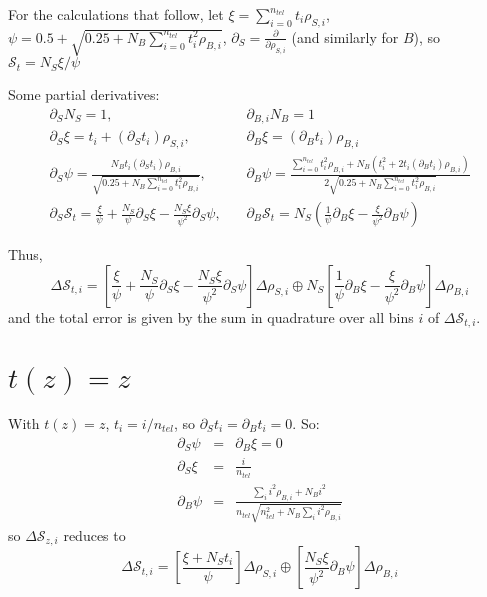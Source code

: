 For the calculations that follow, let $\xi=\sum_{i=0}^{n_{tel}}t_i\rho_{S,i}$, $\psi=0.5+\sqrt{0.25+N_B\sum_{i=0}^{n_{tel}}t^2_i\rho_{B,i}}$, $\partial_{S}=\frac{\partial}{\partial \rho_{S,i}}$ (and similarly for $B$), so $\mathscr{S}_t=N_S\xi/\psi$

Some partial derivatives:
\begin{eqnarray*}
\partial_SN_S=1,&\,&\partial_{B,i}N_B=1\\
\partial_S\xi=t_i+\left(\partial_S t_i\right)\rho_{S,i},&\,&\partial_B\xi=\left(\partial_B t_i\right)\rho_{B,i}\\
\partial_S\psi=\frac{N_Bt_i\left(\partial_S t_i\right)\rho_{B,i}}{\sqrt{0.25+N_B\sum_{i=0}^{n_{tel}}t^2_i\rho_{B,i}}},&\,&\partial_B\psi=\frac{\sum_{i=0}^{n_{tel}}t^2_i\rho_{B,i}+N_B\left(t_i^2+2t_i\left(\partial_B t_i\right)\rho_{B,i}\right)}{2\sqrt{0.25+N_B\sum_{i=0}^{n_{tel}}t^2_i\rho_{B,i}}}\\
\partial_S\mathscr{S}_t=\frac{\xi}{\psi}+\frac{N_S}{\psi}\partial_S \xi-\frac{N_S\xi}{\psi^2}\partial_S \psi,&\,&\partial_B\mathscr{S}_t=N_S\left(\frac{1}{\psi}\partial_B \xi-\frac{\xi}{\psi^2}\partial_B \psi\right)
\end{eqnarray*}

Thus,
\begin{equation}
  \Delta\mathscr{S}_{t,i}=\left[\frac{\xi}{\psi}+\frac{N_S}{\psi}\partial_S \xi-\frac{N_S\xi}{\psi^2}\partial_S \psi\right]\Delta\rho_{S,i}\oplus N_S\left[\frac{1}{\psi}\partial_B \xi-\frac{\xi}{\psi^2}\partial_B \psi\right]\Delta\rho_{B,i}
\end{equation}
and the total error is given by the sum in quadrature over all bins $i$ of $\Delta\mathscr{S}_{t,i}$.
\section{$t\left(z\right)=z$}
With $t\left(z\right)=z$, $t_i=i/n_{tel}$, so $\partial_S t_i=\partial_B t_i=0$. So:
\begin{eqnarray*}
  \partial_S \psi&=&\partial_B \xi=0\\
  \partial_S\xi&=&\frac{i}{n_{tel}}\\
  \partial_B\psi&=&\frac{\sum_ii^2\rho_{B,i}+N_Bi^2}{n_{tel}\sqrt{n_{tel}^2+N_B\sum_ii^2\rho_{B,i}}}
\end{eqnarray*}
so  $\Delta\mathscr{S}_{z,i}$ reduces to
\begin{equation}
\Delta\mathscr{S}_{t,i}=\left[\frac{\xi+N_St_i}{\psi}\right]\Delta\rho_{S,i}\oplus\left[\frac{N_S\xi}{\psi^2}\partial_B \psi\right]\Delta\rho_{B,i}
\label{eqn:dsdb}
\end{equation}

